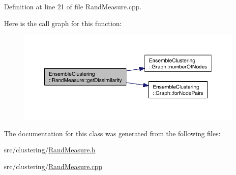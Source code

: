 Definition at line 21 of file Rand\-Measure.\-cpp.



Here is the call graph for this function\-:
\nopagebreak
\begin{figure}[H]
\begin{center}
\leavevmode
\includegraphics[width=350pt]{class_ensemble_clustering_1_1_rand_measure_a30898bac16092f2111d65e19d9ce80a4_cgraph}
\end{center}
\end{figure}




The documentation for this class was generated from the following files\-:\begin{DoxyCompactItemize}
\item 
src/clustering/\hyperlink{_rand_measure_8h}{Rand\-Measure.\-h}\item 
src/clustering/\hyperlink{_rand_measure_8cpp}{Rand\-Measure.\-cpp}\end{DoxyCompactItemize}
